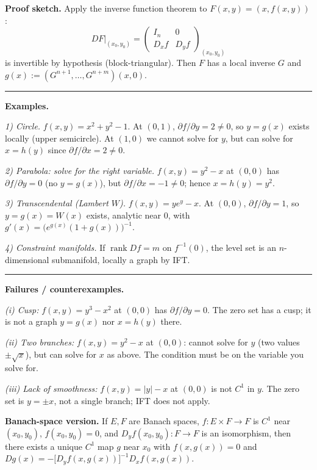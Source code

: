 \documentclass[12pt,a4paper]{article}
\theoremstyle{plain}
\theoremstyle{definition}
\theoremstyle{remark}
\theoremstyle{remark}
\newcommand{\sep}{\vspace{6pt}\hrule\vspace{8pt}}
\begin{document}
	\medskip
	\textbf{Proof sketch.}
	Apply the inverse function theorem to $F(x,y)=(x,f(x,y))$:
	\[
	DF\big|_{(x_0,y_0)}=
	\begin{pmatrix}
		I_n & 0\\
		D_x f & D_y f
	\end{pmatrix}_{(x_0,y_0)}
	\]
	is invertible by hypothesis (block-triangular). Then $F$ has a local inverse $G$ and
	$g(x):=(G^{n+1},\dots,G^{n+m})(x,0)$.
	
	\sep
	
	\textbf{Examples.}
	
	\emph{1) Circle.} $f(x,y)=x^2+y^2-1$. At $(0,1)$, $\partial f/\partial y=2\ne0$,
	so $y=g(x)$ exists locally (upper semicircle). At $(1,0)$ we cannot solve for $y$,
	but can solve for $x=h(y)$ since $\partial f/\partial x=2\ne0$.
	
	\emph{2) Parabola: solve for the right variable.}
	$f(x,y)=y^2-x$ at $(0,0)$ has $\partial f/\partial y=0$ (no $y=g(x)$),
	but $\partial f/\partial x=-1\ne0$; hence $x=h(y)=y^2$.
	
	\emph{3) Transcendental (Lambert $W$).}
	$f(x,y)=y e^y - x$. At $(0,0)$, $\partial f/\partial y=1$, so $y=g(x)=W(x)$ exists,
	analytic near $0$, with $g'(x)=\big(e^{g(x)}(1+g(x))\big)^{-1}$.
	
	\emph{4) Constraint manifolds.}
	If $\operatorname{rank} Df = m$ on $f^{-1}(0)$, the level set is an $n$-dimensional submanifold,
	locally a graph by IFT.
	
	\sep
	
	\textbf{Failures / counterexamples.}
	
	\emph{(i) Cusp:} $f(x,y)=y^3-x^2$ at $(0,0)$ has $\partial f/\partial y=0$.
	The zero set has a cusp; it is not a graph $y=g(x)$ nor $x=h(y)$ there.
	
	\emph{(ii) Two branches:} $f(x,y)=y^2-x$ at $(0,0)$: cannot solve for $y$ (two values
	$\pm\sqrt{x}$), but can solve for $x$ as above. The condition must be on the variable you
	solve for.
	
	\emph{(iii) Lack of smoothness:} $f(x,y)=|y|-x$ at $(0,0)$ is not $C^1$ in $y$.
	The zero set is $y=\pm x$, not a single branch; IFT does not apply.
	
	\medskip
	\textbf{Banach-space version.}
	If $E,F$ are Banach spaces, $f:E\times F\to F$ is $C^1$ near $(x_0,y_0)$,
	$f(x_0,y_0)=0$, and $D_y f(x_0,y_0):F\to F$ is an isomorphism, then there exists a unique
	$C^1$ map $g$ near $x_0$ with $f(x,g(x))=0$ and
	$Dg(x)= -\big[D_y f(x,g(x))\big]^{-1} D_x f(x,g(x))$.
	
\end{document}
